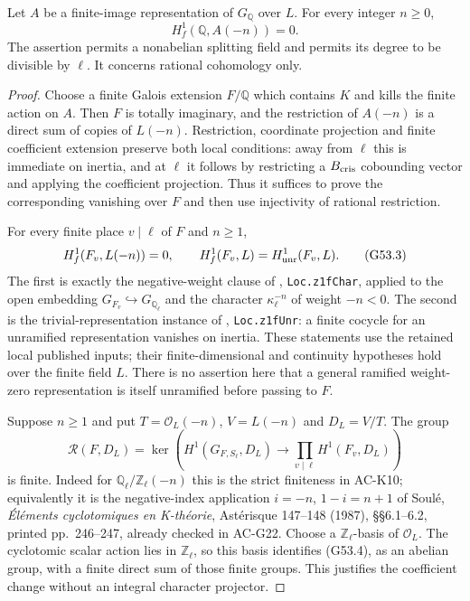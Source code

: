 \begin{lemma}
\label{AC-G53-Artin}
Let $A$ be a finite-image representation of $G_{\mathbb Q}$
over $L$.  For every integer $n\geq0$,
\[
                    H^1_f(\mathbb Q,A(-n))=0.
                                                               \tag{G53.2}
\]
The assertion permits a nonabelian splitting field and permits
its degree to be divisible by $\ell$.  It concerns rational
cohomology only.
\end{lemma}
\begin{proof}
Choose a finite Galois extension $F/\mathbb Q$ which contains
$K$ and kills the finite action on $A$.  Then $F$ is totally
imaginary, and the restriction of $A(-n)$ is a direct sum of
copies of $L(-n)$.  Restriction, coordinate projection and
finite coefficient extension preserve both local conditions:
away from $\ell$ this is immediate on inertia, and at
$\ell$ it follows by restricting a $B_{\rm cris}$ cobounding
vector and applying the coefficient projection.  Thus it
suffices to prove the corresponding vanishing over $F$ and
then use injectivity of rational restriction.

For every finite place $v\mid\ell$ of $F$ and $n\geq1$,
\[
 H^1_f(F_v,L(-n))=0,
 \qquad H^1_f(F_v,L)=H^1_{\rm unr}(F_v,L).
                                                               \tag{G53.3}
\]
The first is exactly the negative-weight clause of
,
\texttt{Loc.z1fChar}, applied to the open embedding
$G_{F_v}\hookrightarrow G_{\mathbb Q_\ell}$ and the
character $\kappa_\ell^{-n}$ of weight $-n<0$.
The second is the trivial-representation instance of
,
\texttt{Loc.z1fUnr}: a finite cocycle for an unramified
representation vanishes on inertia.
These statements use the retained local published inputs;
their finite-dimensional and continuity hypotheses hold
over the finite field $L$.  There is no assertion here that
a general ramified weight-zero representation is itself
unramified before passing to $F$.

Suppose $n\geq1$ and put $T=\mathcal O_L(-n)$,
$V=L(-n)$ and $D_L=V/T$.
The group
\[
 \mathcal R(F,D_L)=
 \ker\!\left(H^1(G_{F,S_\ell},D_L)
       \longrightarrow\prod_{v\mid\ell}H^1(F_v,D_L)\right)
                                                               \tag{G53.4}
\]
is finite.  Indeed for $\mathbb Q_\ell/\mathbb Z_\ell(-n)$
this is the strict finiteness in AC-K10; equivalently it is
the negative-index application $i=-n$, $1-i=n+1$ of
Soul\'e, \emph{\'El\'ements cyclotomiques en K-th\'eorie},
Ast\'erisque 147--148 (1987), \S\S6.1--6.2, printed
pp.~246--247, already checked in AC-G22.
Choose a $\mathbb Z_\ell$-basis of $\mathcal O_L$.
The cyclotomic scalar action lies in $\mathbb Z_\ell$, so
this basis identifies (G53.4), as an abelian group, with
a finite direct sum of those finite groups.  This justifies
the coefficient change without an integral character
projector.


\end{proof}
